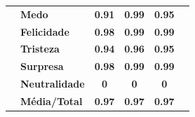 \begin{table}[]
\begin{tabular}{llcccc}
                                       & \textbf{Medo}         & \textbf{0.91}                         & \textbf{0.99}                          & \textbf{0.95}                         &                                       \\
                                       & \textbf{Felicidade}   & \textbf{0.98}                         & \textbf{0.99}                          & \textbf{0.99}                         &                                       \\
                                       & \textbf{Tristeza}     & \textbf{0.94}                         & \textbf{0.96}                          & \textbf{0.95}                         &                                       \\
                                       & \textbf{Surpresa}     & \textbf{0.98}                         & \textbf{0.99}                          & \textbf{0.99}                         &                                       \\
                                       & \textbf{Neutralidade} & \textbf{0}                            & \textbf{0}                             & \textbf{0}                            &                                       \\
                                       & \textbf{Média/Total}  & \textbf{0.97}                         & \textbf{0.97}                          & \textbf{0.97}                         &                                       \\ \hline
\end{tabular}
\end{table}


